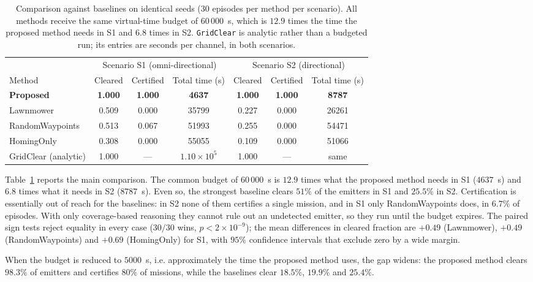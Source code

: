 \documentclass[journal,10pt]{IEEEtran}
\theoremstyle{definition}
\begin{document}
\begin{table}[t]
\caption{Comparison against baselines on identical seeds ($30$ episodes per method per
scenario). All methods receive the same virtual-time budget of $60\,000$~s, which is $12.9$ times
the time the proposed method needs in S1 and $6.8$ times in S2. \texttt{GridClear} is analytic
rather than a budgeted run; its entries are seconds per channel, in both scenarios.}
\label{tab:main}
\centering
\small
\setlength{\tabcolsep}{5pt}
\begin{tabular}{lcccccc}
\toprule
& \multicolumn{3}{c}{Scenario S1 (omni-directional)} & \multicolumn{3}{c}{Scenario S2 (directional)} \\
\cmidrule(lr){2-4}\cmidrule(lr){5-7}
Method & Cleared & Certified & Total time (s) & Cleared & Certified & Total time (s) \\
\midrule
\textbf{Proposed}   & \textbf{1.000} & \textbf{1.000} & \textbf{4637} & \textbf{1.000} & \textbf{1.000} & \textbf{8787} \\
Lawnmower           & 0.509 & 0.000 & 35799 & 0.227 & 0.000 & 26261 \\
RandomWaypoints     & 0.513 & 0.067 & 51993 & 0.255 & 0.000 & 54471 \\
HomingOnly          & 0.308 & 0.000 & 55055 & 0.109 & 0.000 & 51066 \\
\midrule
GridClear (analytic) & 1.000 & --- & $1.10\times10^5$ & 1.000 & --- & same \\
\bottomrule
\end{tabular}
\end{table}

Table~\ref{tab:main} reports the main comparison. The common budget of $60\,000$~s is $12.9$
times what the proposed method needs in S1 ($4637$~s) and $6.8$ times what it needs in S2
($8787$~s). Even so, the strongest baseline clears $51\%$ of the emitters in S1 and $25.5\%$ in S2.
Certification is essentially out of reach for the baselines: in S2 none of them certifies a single
mission, and in S1 only RandomWaypoints does, in $6.7\%$ of episodes. With only coverage-based
reasoning they cannot rule out an undetected emitter, so they run until the budget expires. The paired sign tests
reject equality in every case ($30/30$ wins, $p<2\times10^{-9}$); the mean differences in cleared
fraction are $+0.49$ (Lawnmower), $+0.49$ (RandomWaypoints) and $+0.69$ (HomingOnly) for S1, with
$95\%$ confidence intervals that exclude zero by a wide margin.

When the budget is reduced to $5000$~s, i.e. approximately the time the proposed method uses, the
gap widens: the proposed method clears $98.3\%$ of emitters and certifies $80\%$ of missions, while
the baselines clear $18.5\%$, $19.9\%$ and $25.4\%$.
\end{document}
